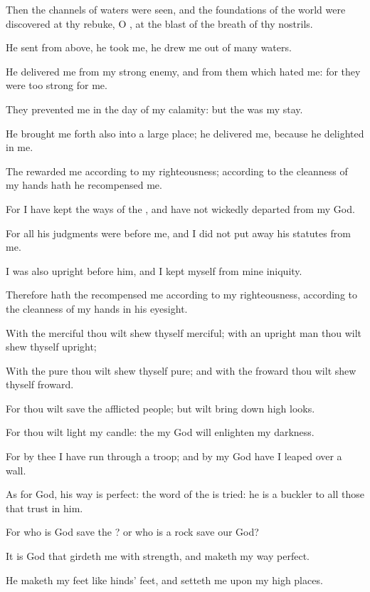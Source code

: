 \verse Then the channels of waters were seen, and the foundations of the world were discovered at thy rebuke, O \LORD, at the blast of the breath of thy nostrils.

\verse He sent from above, he took me, he drew me out of many waters.

\verse He delivered me from my strong enemy, and from them which hated me: for they were too strong for me.

\verse They prevented me in the day of my calamity: but the \LORD was my stay.

\verse He brought me forth also into a large place; he delivered me, because he delighted in me.

\verse The \LORD rewarded me according to my righteousness; according to the cleanness of my hands hath he recompensed me.

\verse For I have kept the ways of the \LORD, and have not wickedly departed from my God.

\verse For all his judgments were before me, and I did not put away his statutes from me.

\verse I was also upright before him, and I kept myself from mine iniquity.

\verse Therefore hath the \LORD recompensed me according to my righteousness, according to the cleanness of my hands in his eyesight.

\verse With the merciful thou wilt shew thyself merciful; with an upright man thou wilt shew thyself upright;

\verse With the pure thou wilt shew thyself pure; and with the froward thou wilt shew thyself froward.

\verse For thou wilt save the afflicted people; but wilt bring down high looks.

\verse For thou wilt light my candle: the \LORD my God will enlighten my darkness.

\verse For by thee I have run through a troop; and by my God have I leaped over a wall.

\verse As for God, his way is perfect: the word of the \LORD is tried: he is a buckler to all those that trust in him.

\verse For who is God save the \LORD? or who is a rock save our God?

\verse It is God that girdeth me with strength, and maketh my way perfect.

\verse He maketh my feet like hinds' feet, and setteth me upon my high places.

